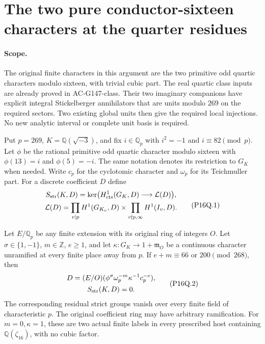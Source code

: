 \section{The two pure conductor-sixteen characters at the quarter residues}
\label{sec:pure-conductor16-quartic-strict}

\paragraph{Scope.}
The original finite characters in this argument are the two primitive
odd quartic characters modulo sixteen, with trivial cubic part.
The real quartic class inputs are already proved in AC-G147-class.
Their two imaginary companions have explicit integral Stickelberger
annihilators that are units modulo $269$ on the required sectors.
Two existing global units then give the required local injections.
No new analytic interval or complete unit basis is required.

Put $p=269$, $K=\mathbb Q(\sqrt{-3})$, and fix
$i\in\mathbb Q_p$ with $i^2=-1$ and $i\equiv82\pmod p$.
Let $\phi$ be the rational primitive odd quartic character modulo
sixteen with $\phi(13)=i$ and $\phi(5)=-i$.
The same notation denotes its restriction to $G_K$ when needed.
Write $c_p$ for the cyclotomic character and $\omega_p$ for its
Teichmuller part.  For a discrete coefficient $D$ define
\[
 \begin{gathered}
 S_{\rm str}(K,D)=\ker\bigl(H^1_{\rm cts}(G_K,D)
                                  \longrightarrow\mathcal L(D)\bigr),\\
 \mathcal L(D)=\prod_{v\mid p}H^1(G_{K_v},D)
              \times\prod_{v\nmid p,\infty}H^1(I_v,D).
 \end{gathered}
 \tag{P16Q.1}
\]

\begin{theorem}
\label{AC-G166}
Let $E/\mathbb Q_p$ be any finite extension with its original
ring of integers $O$.  Let $\sigma\in\{1,-1\}$,
$m\in\mathbb Z$, $e\geq1$, and let
$\kappa:G_K\to1+\mathfrak m_O$ be a continuous character
unramified at every finite place away from $p$.
If $e+m\equiv66$ or $200\pmod{268}$, then
\[
 \begin{gathered}
 D=(E/O)(\phi^\sigma\omega_p^{-m}\kappa^{-1}c_p^{-e}),\\
                         S_{\rm str}(K,D)=0.
 \end{gathered}
 \tag{P16Q.2}
\]
The corresponding residual strict groups vanish over every finite
field of characteristic $p$.  The original coefficient ring may
have arbitrary ramification.  For $m=0,\kappa=1$, these are two
actual finite labels in every prescribed host containing
$\mathbb Q(\zeta_{16})$, with no cubic factor.
\end{theorem}

